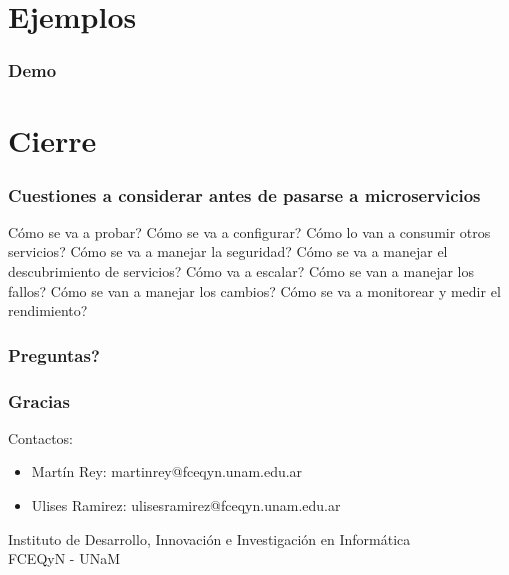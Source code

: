 \documentclass{beamer}
\begin{document}
\section{Ejemplos}

\begin{frame}
  	\frametitle{Demo}
  	
\end{frame}

\section{Cierre}

\begin{frame}
	\frametitle{Cuestiones a considerar antes de pasarse a microservicios}
	\begin{enumerate}
		\list Cómo se va a probar?
		\list Cómo se va a configurar?
		\list Cómo lo van a consumir otros servicios?
		\list Cómo se va a manejar la seguridad?
		\list Cómo se va a manejar el descubrimiento de servicios?
		\list Cómo va a escalar?
		\list Cómo se van a manejar los fallos?
		\list Cómo se van a manejar los cambios?
		\list Cómo se va a monitorear y medir el rendimiento?
	\end{enumerate}
\end{frame}

\begin{frame}
    \frametitle{Preguntas?}

\end{frame}

\begin{frame}
    \frametitle{Gracias}
	Contactos:\\
    \begin{itemize}
	\item {Martín Rey: martinrey@fceqyn.unam.edu.ar}
	\item {Ulises Ramirez: ulisesramirez@fceqyn.unam.edu.ar}
	\end{itemize}

	Instituto de Desarrollo, Innovación e Investigación en Informática \\ FCEQyN - UNaM
\end{frame}
\end{document}
